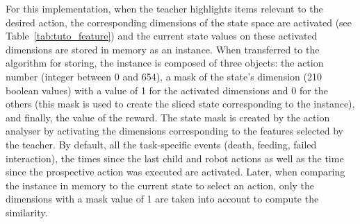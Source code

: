 For this implementation, when the teacher highlights items relevant to the desired action, the corresponding dimensions of the state space are activated (see Table~\ref{tab:tuto_feature}) and the current state values on these activated dimensions are stored in memory as an instance. %
When transferred to the algorithm for storing, the instance is composed of three objects: the action number (integer between 0 and 654), a mask of the state's dimension (210 boolean values) with a value of 1 for the activated dimensions and 0 for the others (this mask is used to create the sliced state corresponding to the instance), and finally, the value of the reward. The state mask is created by the action analyser by activating the dimensions corresponding to the features selected by the teacher. By default, all the task-specific events (death, feeding, failed interaction), the times since the last child and robot actions as well as the time since the prospective action was executed are activated. Later, when comparing the instance in memory to the current state to select an action, only the dimensions with a mask value of 1 are taken into account to compute the similarity.




